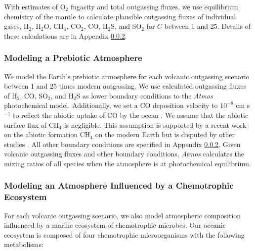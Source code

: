 With estimates of O$_2$ fugacity and total outgassing fluxes, we use equilibrium chemistry of the mantle to calculate plausible outgassing fluxes of individual gases, H$_2$, H$_2$O, CH$_4$, CO$_2$, CO, H$_2$S, and SO$_2$ for $C$ between 1 and 25. Details of these calculations are in 
Appendix \ref{}. %

\subsubsection{Modeling a Prebiotic Atmosphere}

We model the Earth's prebiotic atmosphere for each volcanic outgassing scenario between 1 and 25 times modern outgassing. We use calculated outgassing fluxes of H$_2$, CO, SO$_2$, and H$_2$S as lower boundary conditions to the \textit{Atmos} photochemical model. Additionally, we set a CO deposition velocity to $10^{-8}$ cm s$^{-1}$ to reflect the abiotic uptake of CO by the ocean \citep{Kharecha_2005}. We assume that the abiotic surface flux of CH$_4$ is negligible. This assumption is supported by a recent work on the abiotic formation CH$_4$ on the modern Earth \citep{Fiebig_2019} but is disputed by other studies \citep{Etiope_2013}. All other boundary conditions are specified in 
Appendix \ref{}. %
Given volcanic outgassing fluxes and other boundary conditions, \textit{Atmos} calculates the mixing ratios of all species when the atmosphere is at photochemical equilibrium.

\subsubsection{Modeling an Atmosphere Influenced by a Chemotrophic Ecosystem}

For each volcanic outgassing scenario, we also model atmospheric composition influenced by a marine ecosystem of chemotrophic microbes. Our oceanic ecosystem is composed of four chemotrophic microorganisms with the following metabolisms:

